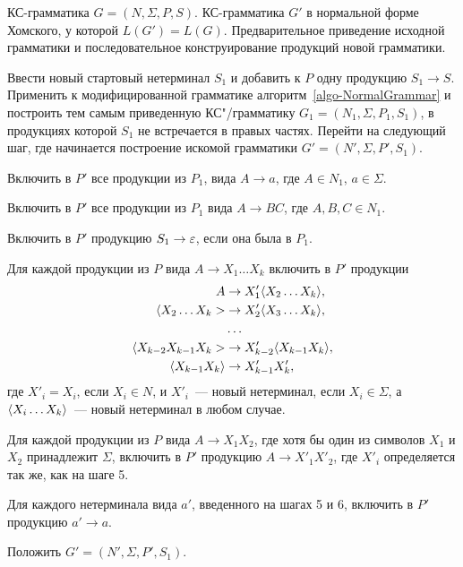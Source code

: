 {\label{algo-Homsky}КС-грамматика $G=(N,\Sigma,P,S)$.}
{КС-грамматика $G'$ в нормальной форме Хомского, у которой $L(G')=L(G)$.}
{Предварительное приведение исходной грамматики и последовательное конструирование продукций новой грамматики.}
{
\item
Ввести новый стартовый нетерминал $S_1$ и добавить к $P$ одну продукцию $S_1\to S$. Применить к модифицированной грамматике алгоритм~\ref{algo-NormalGrammar} и построить тем самым приведенную КС"/грамматику $G_1=(N_1,\Sigma,P_1,S_1)$, в продукциях которой $S_1$ не встречается в правых частях. Перейти на следующий шаг, где начинается построение искомой грамматики $G'=(N',\Sigma,P',S_1)$.

\item Включить в $P'$ все продукции из $P_1$, вида $A\to a$, где $A\in N_1$, $a\in\Sigma$.

\item Включить в $P'$ все продукции из $P_1$ вида $A\to BC$, где $A,B,C\in N_1$.

\item Включить в $P'$ продукцию $S_1\to\varepsilon$, если она была в $P_1$.

\item Для каждой продукции из $P$ вида $A\to X_1 \ldots X_k$ включить в $P'$ продукции
\begin{align*}
    A  &\to X'_1 \langle X_2\ldots X_k \rangle, \\
    \langle X_2 \ldots X_k> &\to X'_2 \langle X_3\ldots X_k \rangle, \\
     & \ldots\\
    \langle X_{k-2} X_{k-1} X_k> &\to X'_{k-2} \langle X_{k-1} X_k \rangle, \\
    \langle X_{k-1} X_k \rangle &\to X'_{k-1} X'_k,
\end{align*}
где $X'_i=X_i$, если $X_i\in N$, и $X'_i$~--- новый нетерминал,
если $X_i\in\Sigma$, а $\langle X_i\ldots X_k \rangle$~--- новый нетерминал в
любом случае.

\item Для каждой продукции из $P$ вида $A\to X_1X_2$, где хотя бы один из символов $X_1$ и $X_2$ принадлежит $\Sigma$, включить в $P'$ продукцию $A\to X'_1X'_2$, где $X'_i$ определяется так же, как на шаге 5.

\item Для каждого нетерминала вида $a'$, введенного на шагах 5 и 6, включить в $P'$ продукцию $a'\to a$.

\item Положить $G'=(N',\Sigma,P',S_1)$.
}
